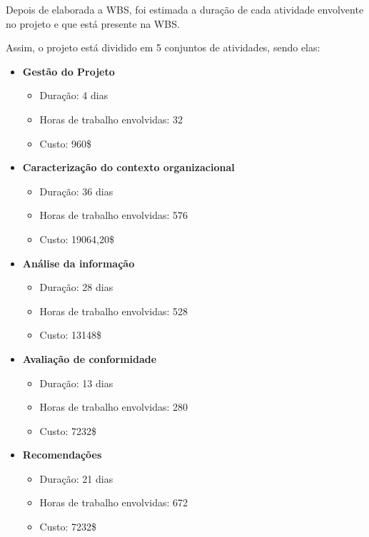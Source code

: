 Depois de elaborada a WBS, foi estimada a duração de cada atividade envolvente no projeto e que está presente na WBS.

Assim, o projeto está dividido em 5 conjuntos de atividades, sendo elas:

\begin{itemize}
	\item \textbf{Gestão do Projeto}
		\begin{itemize}
			\item Duração: 4 dias 
			\item Horas de trabalho envolvidas: 32
			\item Custo: 960\$
		\end{itemize}
	\item \textbf{Caracterização do contexto organizacional}
		\begin{itemize}
			\item Duração: 36 dias 
			\item Horas de trabalho envolvidas: 576
			\item Custo: 19064,20\$
		\end{itemize}
	\item \textbf{Análise da informação}
		\begin{itemize}
			\item Duração: 28 dias
			\item Horas de trabalho envolvidas: 528
			\item Custo: 13148\$
		\end{itemize}
	\item \textbf{Avaliação de conformidade}
		\begin{itemize}
			\item Duração: 13 dias
			\item Horas de trabalho envolvidas: 280
			\item Custo: 7232\$
    \end{itemize}
    \item \textbf{Recomendações}
		\begin{itemize}
      \item Duração: 21 dias 
      \item Horas de trabalho envolvidas: 672
			\item Custo: 7232\$
		\end{itemize}
\end{itemize}

